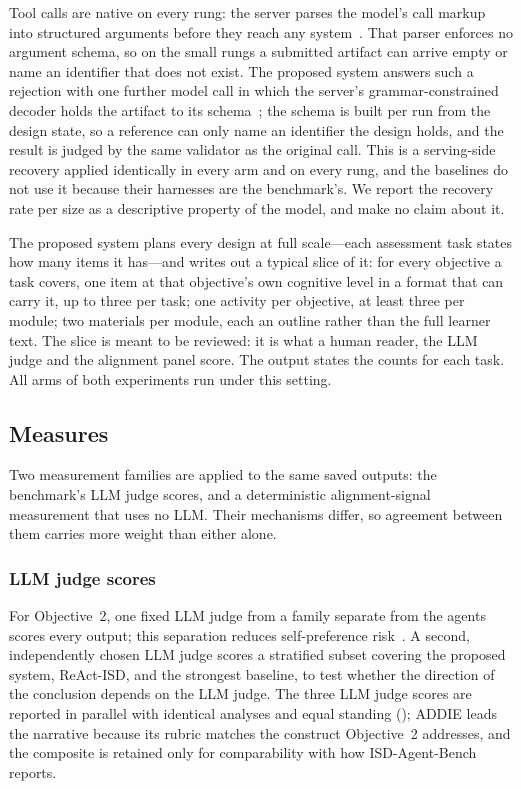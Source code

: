 Tool calls are native on every rung: the server parses the model's call markup into
structured arguments before they reach any system~\cite{kwon2023vllm}. That parser
enforces no argument schema, so on the small rungs a submitted artifact can arrive
empty or name an identifier that does not exist. The proposed system answers such a
rejection with one further model call in which the server's grammar-constrained
decoder holds the artifact to its schema~\cite{dong2024xgrammar}; the schema is
built per run from the design state, so a reference can only name an identifier the
design holds, and the result is judged by the same validator as the original call.
This is a serving-side recovery applied identically in every arm and on every rung,
and the baselines do not use it because their harnesses are the benchmark's. We
report the recovery rate per size as a descriptive property of the model, and make
no claim about it.

The proposed system plans every design at full scale---each assessment task
states how many items it has---and writes out a typical slice of it: for every
objective a task covers, one item at that objective's own cognitive level in a
format that can carry it, up to three per task; one activity per objective, at
least three per module; two materials per module, each an outline rather than
the full learner text. The slice is meant to be reviewed: it is what a human
reader, the LLM judge and the alignment panel score. The output states the
counts for each task. All arms of both experiments run under this setting.

\subsection{Measures}
\label{sec:metrics}

Two measurement families are applied to the same saved outputs: the benchmark's
LLM judge scores, and a deterministic alignment-signal measurement that uses no LLM.
Their mechanisms differ, so agreement between them carries more weight than either
alone.

\subsubsection{LLM judge scores}

For Objective~2, one fixed LLM judge from a family separate from the agents scores every
output; this separation reduces self-preference risk~\cite{panickssery2024llm}. A
second, independently chosen LLM judge scores a stratified subset covering the proposed
system, ReAct-ISD, and the strongest baseline, to test whether the direction of the
conclusion depends on the LLM judge. The three LLM judge scores are reported in parallel
with identical analyses and equal standing (); ADDIE leads
the narrative because its rubric matches the construct Objective~2 addresses, and
the composite is retained only for comparability with how ISD-Agent-Bench reports.

